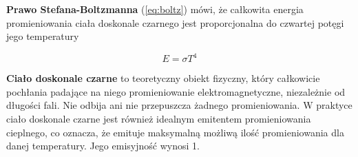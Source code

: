 \vspace{12pt}

\textbf{Prawo Stefana-Boltzmanna} (\ref{eq:boltz}) mówi, że całkowita energia promieniowania ciała doskonale czarnego jest proporcjonalna do czwartej potęgi jego temperatury

\vspace{12pt}

\begin{equation}
    E = \sigma T^4
    \label{eq:boltz}
\end{equation}






\textbf{Ciało doskonale czarne} to teoretyczny obiekt fizyczny, który całkowicie pochłania padające na niego promieniowanie elektromagnetyczne, niezależnie od długości fali. Nie odbija ani nie przepuszcza żadnego promieniowania. W praktyce ciało doskonale czarne jest również idealnym emitentem promieniowania cieplnego, co oznacza, że emituje maksymalną możliwą ilość promieniowania dla danej temperatury. Jego emisyjność wynosi 1.

